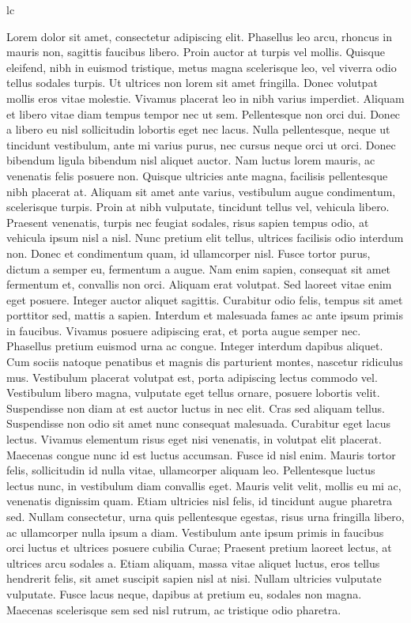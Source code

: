 \documentclass{article}
\begin{document}
lc
\newpage

\beginnumbering
\pstart
Lorem  dolor sit amet, consectetur adipiscing elit. Phasellus leo arcu, rhoncus in mauris non, sagittis faucibus libero. Proin auctor at turpis vel mollis. Quisque eleifend, nibh in euismod tristique, metus magna scelerisque leo, vel viverra odio tellus sodales turpis. Ut ultrices non lorem sit amet fringilla. Donec volutpat mollis eros vitae molestie. Vivamus placerat leo in nibh varius imperdiet. Aliquam et libero vitae diam tempus tempor nec ut sem.
\pend
\pstart
Pellentesque non orci dui. Donec a libero eu nisl sollicitudin lobortis eget nec lacus. Nulla pellentesque, neque ut tincidunt vestibulum, ante mi varius purus, nec cursus neque orci ut orci. Donec bibendum ligula bibendum nisl aliquet auctor. Nam luctus lorem mauris, ac venenatis felis posuere non. Quisque ultricies ante magna, facilisis pellentesque nibh placerat at. Aliquam sit amet ante varius, vestibulum augue condimentum, scelerisque turpis. Proin at nibh vulputate, tincidunt tellus vel, vehicula libero. Praesent venenatis, turpis nec feugiat sodales, risus sapien tempus odio, at vehicula ipsum nisl a nisl. Nunc pretium elit tellus, ultrices facilisis odio interdum non. Donec et condimentum quam, id ullamcorper nisl.
\pend
\pstart
Fusce tortor purus, dictum a semper eu, fermentum a augue. Nam enim sapien, consequat sit amet fermentum et, convallis non orci. Aliquam erat volutpat. Sed laoreet vitae enim eget posuere. Integer auctor aliquet sagittis. Curabitur odio felis, tempus sit amet porttitor sed, mattis a sapien. Interdum et malesuada fames ac ante ipsum primis in faucibus. Vivamus posuere adipiscing erat, et porta augue semper nec.
\pend
\pstart
Phasellus pretium euismod urna ac congue. Integer interdum dapibus aliquet. Cum sociis natoque penatibus et magnis dis parturient montes, nascetur ridiculus mus. Vestibulum placerat volutpat est, porta adipiscing lectus commodo vel. Vestibulum libero magna, vulputate eget tellus ornare, posuere lobortis velit. Suspendisse non diam at est auctor luctus in nec elit. Cras sed aliquam tellus. Suspendisse non odio sit amet nunc consequat malesuada. Curabitur eget lacus lectus. Vivamus elementum risus eget nisi venenatis, in volutpat elit placerat. Maecenas congue nunc id est luctus accumsan. Fusce id nisl enim.
\pend
\pstart
Mauris tortor felis, sollicitudin id nulla vitae, ullamcorper aliquam leo. Pellentesque luctus lectus nunc, in vestibulum diam convallis eget. Mauris velit velit, mollis eu mi ac, venenatis dignissim quam. Etiam ultricies nisl felis, id tincidunt augue pharetra sed. Nullam consectetur, urna quis pellentesque egestas, risus urna fringilla libero, ac ullamcorper nulla ipsum a diam. Vestibulum ante ipsum primis in faucibus orci luctus et ultrices posuere cubilia Curae; Praesent pretium laoreet lectus, at ultrices arcu sodales a. Etiam aliquam, massa vitae aliquet luctus, eros tellus hendrerit felis, sit amet suscipit sapien nisl at nisi. Nullam ultricies vulputate vulputate. Fusce lacus neque, dapibus at pretium eu, sodales non magna. Maecenas scelerisque sem sed nisl rutrum, ac tristique odio pharetra.
\end{document}
